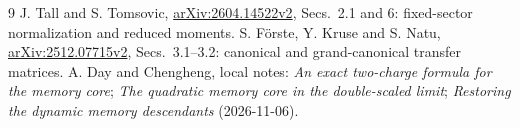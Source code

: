 \documentclass[11pt,a4paper]{article}
\begin{document}
\begin{thebibliography}{9}\small
{} J. Tall and S. Tomsovic,
\href{https://arxiv.org/html/2604.14522v2}{arXiv:2604.14522v2},
Secs.~2.1 and 6: fixed-sector normalization and reduced moments.
 S. F\"orste, Y. Kruse and S. Natu,
\href{https://arxiv.org/html/2512.07715v2}{arXiv:2512.07715v2},
Secs.~3.1--3.2: canonical and grand-canonical transfer matrices.
 A. Day and Chengheng, local notes:
\emph{An exact two-charge formula for the memory core};
\emph{The quadratic memory core in the double-scaled limit};
\emph{Restoring the dynamic memory descendants} (2026-11-06).
\end{thebibliography}
\end{document}

